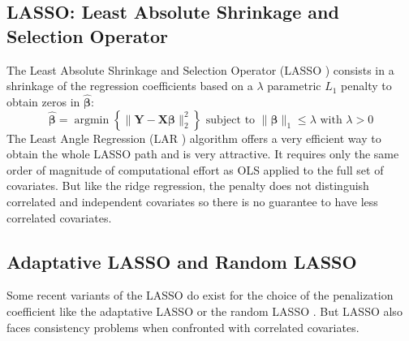 \documentclass[11pt,a4paper]{report}
\begin{document}
		\subsection{LASSO: Least Absolute Shrinkage and Selection Operator }
			\cite{tibshiranilasso}  
			\cite{tibshirani1996regression} 
			\cite{efron2004least} %
			\cite{Zhao2006MSC}%
			\cite{SAM10088}%
The Least Absolute Shrinkage and Selection Operator (\textsc{LASSO} \cite{tibshirani1996regression}) consists in a shrinkage of the regression coefficients based on a $\lambda$ parametric $L_1$ penalty to obtain zeros in $\hat{\boldsymbol{\beta}}$:
		\begin{equation}
		 \boldsymbol{\hat{\beta}}=\operatorname{argmin} \left\lbrace \parallel \boldsymbol{Y}-\boldsymbol{X\beta}\parallel_2^2 \right\rbrace \textrm{ subject to } \parallel\boldsymbol{\beta} \parallel_1\leq \lambda \textrm{ with } \lambda>0
		\end{equation}	
	 The Least Angle Regression (\textsc{LAR} \cite{efron2004least}) algorithm offers a very efficient way to obtain the whole LASSO path and is very attractive. It requires only the same order of magnitude of computational effort as \textsc{OLS} applied to the full set of covariates. But like the ridge regression, the penalty does not distinguish correlated and independent covariates so there is no guarantee to have less correlated covariates.



		\subsection{Adaptative LASSO and Random LASSO}
			\cite{zou2006adaptive}%
			\cite{wang2011random}%
			 Some recent variants of the \textsc{LASSO} do exist for the choice of the penalization coefficient like the adaptative \textsc{LASSO} \cite{zou2006adaptive} or the random \textsc{LASSO} \cite{wang2011random}.  But \textsc{LASSO} also faces consistency problems \cite{Zhao2006MSC} when confronted with correlated covariates.
\end{document}

